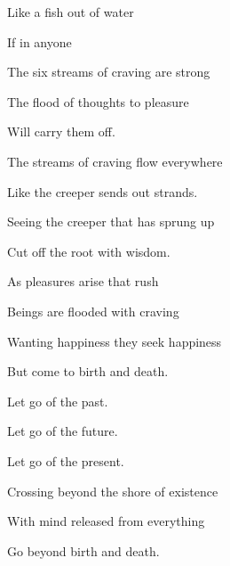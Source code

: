 \documentclass[a5paper,10pt,english]{book}
\begin{document}
\begin{DUlineblock}{0em}
\item[] 
\item[] Like a fish out of water
\item[] If in anyone
\item[] The six streams of craving are strong
\item[] The flood of thoughts to pleasure
\item[] Will carry them off.
\end{DUlineblock}

\begin{DUlineblock}{0em}
\item[] 
\item[] The streams of craving flow everywhere
\item[] Like the creeper sends out strands.
\item[] Seeing the creeper that has sprung up
\item[] Cut off the root with wisdom.
\end{DUlineblock}

\begin{DUlineblock}{0em}
\item[] 
\item[] As pleasures arise that rush
\item[] Beings are flooded with craving
\item[] Wanting happiness they seek happiness
\item[] But come to birth and death.
\end{DUlineblock}

\begin{DUlineblock}{0em}
\item[] 
\item[] Let go of the past.
\item[] Let go of the future.
\item[] Let go of the present.
\item[] Crossing beyond the shore of existence
\item[] With mind released from everything
\item[] Go beyond birth and death.
\end{DUlineblock}
\end{document}

